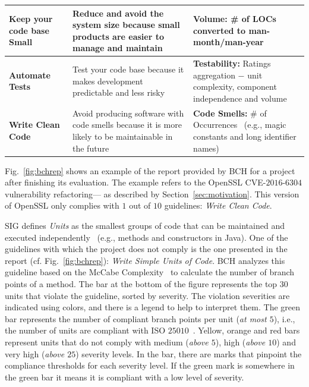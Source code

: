 \documentclass[smallextended]{svjour3}       %
\begin{document}
\begin{table}[h]
\begin{tabular}{L{1.66cm}L{3.3cm}L{2.7cm}}
\textbf{Keep your code base Small} & Reduce and avoid the system size because
small products are easier to manage and maintain & \textbf{Volume:} \# of LOCs converted 
to man-month/man-year~\cite{criteria:2017} \\\midrule

\textbf{Automate Tests} & Test your code base because it makes development
predictable and less risky & \textbf{Testability:} Ratings aggregation $-$ unit 
complexity, component independence and volume~\cite{Visser:2016:OREILLY}
 \\\midrule

\textbf{Write Clean Code} & Avoid producing software with code smells because
it is more likely to be maintainable in the future & \textbf{Code Smells:} 
\# of Occurrences~\cite{Visser:2016:OREILLY} (e.g., magic constants and long 
identifier names) \\
\bottomrule
\end{tabular}
\label{tab:guidelines}
\end{table}


Fig.~\ref{fig:bchrep} shows an example of the report
provided by BCH for a project after finishing its evaluation. The example
refers to the OpenSSL CVE-$2016$-$6304$ vulnerability refactoring---
as described by Section~\ref{sec:motivation}. This
version of OpenSSL only complies with $1$ out of $10$ guidelines: \emph{Write
Clean Code}.

SIG defines \emph{Units} as the smallest groups of code that can be maintained
and executed independently~\cite{Visser:2016:OREILLY} (e.g., methods and
constructors in Java). One of the guidelines with which the project does not
comply is the one presented in the report (cf. Fig.~\ref{fig:bchrep}):
\emph{Write Simple Units of Code}. BCH analyzes this guideline based on the
McCabe Complexity~\cite{1702388} to calculate the number of branch points of a
method. The bar at the bottom of the figure represents the top $30$ units that
violate the guideline, sorted by severity. The violation severities are
indicated using colors, and there is a legend to help to interpret them. The
green bar represents the number of compliant branch points per unit (\emph{at
most $5$}), i.e., the number of units are compliant with ISO
$25010$~\cite{iso:2011}. Yellow, orange and red bars represent units that do not
comply with medium (\emph{above $5$}), high (\emph{above $10$}) and very high
(\emph{above $25$}) severity levels. In the bar, there are marks that pinpoint
the compliance thresholds for each severity level. If the green mark is
somewhere in the green bar it means it is compliant with a low level of
severity.
\end{document}

